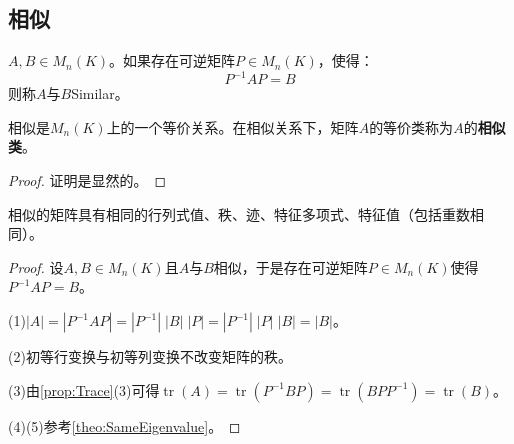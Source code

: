 \subsection{相似}
\begin{definition}
	$A,B\in M_{n}(K)$。如果存在可逆矩阵$P\in M_{n}(K)$，使得：
	\begin{equation*}
		P^{-1}AP=B
	\end{equation*}
	则称$A$与$B$\gls{Similar}。
\end{definition}
\begin{theorem}
	相似是$M_{n}(K)$上的一个等价关系。在相似关系下，矩阵$A$的等价类称为$A$的\textbf{相似类}。
\end{theorem}
\begin{proof}
	证明是显然的。
\end{proof}
\begin{property}[相似的不变量]\label{prop:Similar}
	相似的矩阵具有相同的行列式值、秩、迹、特征多项式、特征值（包括重数相同）。
\end{property}
\begin{proof}
	设$A,B\in M_{n}(K)$且$A$与$B$相似，于是存在可逆矩阵$P\in M_{n}(K)$使得$P^{-1}AP=B$。\par
	(1)$|A|=|P^{-1}AP|=|P^{-1}|\;|B|\;|P|=|P^{-1}|\;|P|\;|B|=|B|$。\par
	(2)初等行变换与初等列变换不改变矩阵的秩。\par
	(3)由\cref{prop:Trace}(3)可得$\operatorname{tr}(A)=\operatorname{tr}(P^{-1}BP)=\operatorname{tr}(BPP^{-1})=\operatorname{tr}(B)$。\par
	(4)(5)参考\cref{theo:SameEigenvalue}。
\end{proof}

